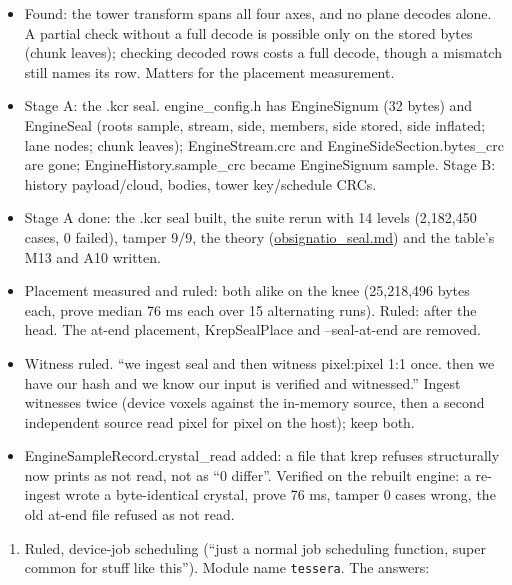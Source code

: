 \begin{itemize}
\item Found: the tower transform spans all four axes, and no plane decodes alone. A partial check without a full decode is possible only on the stored bytes (chunk leaves); checking decoded rows costs a full decode, though a mismatch still names its row. Matters for the placement measurement.
\item Stage A: the .kcr seal. engine\_\allowbreak{}config.h has EngineSignum (32 bytes) and EngineSeal (roots sample, stream, side, members, side stored, side inflated; lane nodes; chunk leaves); EngineStream.crc and EngineSideSection.bytes\_\allowbreak{}crc are gone; EngineHistory.sample\_\allowbreak{}crc became EngineSignum sample. Stage B: history payload/cloud, bodies, tower key/schedule CRCs.
\item Stage A done: the .kcr seal built, the suite rerun with 14 levels (2,182,450 cases, 0 failed), tamper 9/9, the theory (\hyperref[chap:obsignatio-seal]{obsignatio\_\allowbreak{}seal.md}) and the table's M13 and A10 written.
\item Placement measured and ruled: both alike on the knee (25,218,496 bytes each, prove median 76 ms each over 15 alternating runs). Ruled: after the head. The at-end placement, KrepSealPlace and --seal-at-end are removed.
\item Witness ruled. “we ingest seal and then witness pixel:pixel 1:1 once. then we have our hash and we know our input is verified and witnessed.” Ingest witnesses twice (device voxels against the in-memory source, then a second independent source read pixel for pixel on the host); keep both.
\item EngineSampleRecord.crystal\_\allowbreak{}read added: a file that krep refuses structurally now prints as not read, not as “0 differ”. Verified on the rebuilt engine: a re-ingest wrote a byte-identical crystal, prove 76 ms, tamper 0 cases wrong, the old at-end file refused as not read.
\end{itemize}

\begin{enumerate}
\item Ruled, device-job scheduling (“just a normal job scheduling function, super common for stuff like this”). Module name \texttt{tessera}. The answers:
\end{enumerate}

